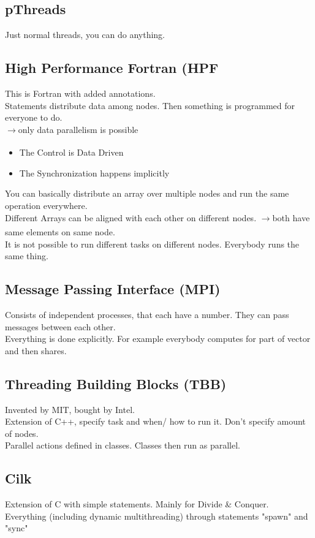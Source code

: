 \documentclass[a4paper]{article}
\newcommand{\arrow}{$\xrightarrow[]{}$}
\begin{document}
\subsection{pThreads}
Just normal threads, you can do anything.

\subsection{High Performance Fortran (HPF}
This is Fortran with added annotations.\\
Statements distribute data among nodes. Then something is programmed for everyone to do.\\
\arrow only data parallelism is possible
\begin{itemize}
\setlength{\itemsep}{-3pt}
\item The Control is Data Driven
\item The Synchronization happens implicitly
\end{itemize}
You can basically distribute an array over multiple nodes and run the same operation everywhere.\\
Different Arrays can be aligned with each other on different nodes. \arrow both have same elements on same node.\\
It is not possible to run different tasks on different nodes. Everybody runs the same thing.

\subsection{Message Passing Interface (MPI)}
Consists of independent processes, that each have a number. They can pass messages between each other.\\ Everything is done explicitly. For example everybody computes for part of vector and then shares.\\

\subsection{Threading Building Blocks (TBB)}
Invented by MIT, bought by Intel.\\
Extension of C++, specify task and when/ how to run it. Don't specify amount of nodes.\\
Parallel actions defined in classes. Classes then run as parallel.

\subsection{Cilk}
Extension of C with simple statements. Mainly for Divide \& Conquer.\\
Everything (including dynamic multithreading) through statements "spawn" and "sync"
\end{document}
